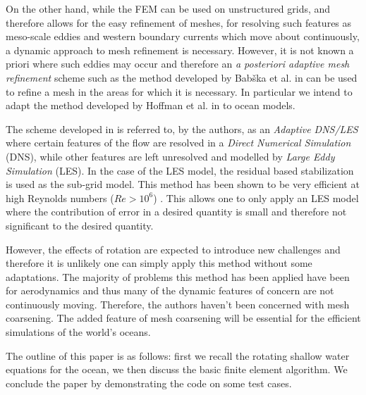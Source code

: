 On the other hand, while the FEM can be used on unstructured grids, and
therefore allows for the easy refinement of meshes, for resolving such
features as meso-scale eddies and western boundary currents which move about
continuously, a dynamic approach to mesh refinement is necessary.  However, it
is not known a priori where such eddies may occur and therefore an \emph{a
posteriori adaptive mesh refinement} scheme such as the method developed by
Bab{\v{s}}ka et al. in \cite{Babuska1978} can be used to refine a mesh in the
areas for which it is necessary. In particular we intend to adapt the method
developed by Hoffman et al. in \cite{Hoffman2004} to ocean models. 

The scheme developed in \cite{Hoffman2004} is referred to, by the authors, as
an \emph{Adaptive DNS/LES} where certain features of the flow are resolved in a
\emph{Direct Numerical Simulation} (DNS), while other features are left
unresolved and modelled by \emph{Large Eddy Simulation} (LES). In the case of
the LES model, the residual based stabilization is used as the sub-grid model.
This method has been shown to be very efficient at high Reynolds numbers
($Re>10^6$) \cite{Jansson2011}. This allows one to only apply an LES model
where the contribution of error in a desired quantity is small and therefore
not significant to the desired quantity.

However, the effects of rotation are expected to introduce new challenges and
therefore it is unlikely one can simply apply this method without some
adaptations. The majority of problems this method has been applied have been
for aerodynamics and thus many of the dynamic features of concern are not
continuously moving. Therefore, the authors haven't been concerned with mesh
coarsening. The added feature of mesh coarsening will be essential for the
efficient simulations of the world's oceans.

The outline of this paper is as follows: first we recall the rotating shallow
water equations for the ocean, we then discuss the basic finite element
algorithm. We conclude the paper by demonstrating the code on some test cases.
